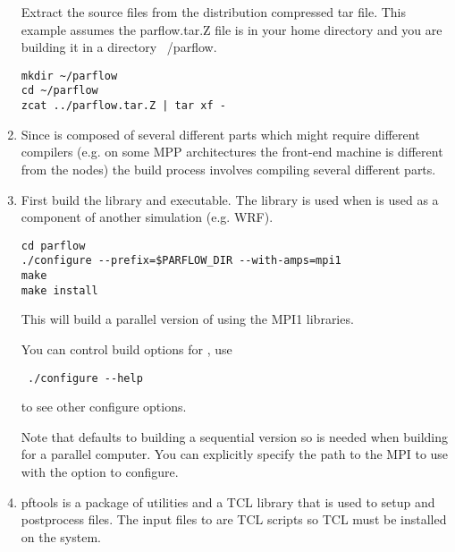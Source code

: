 \begin{enumerate}
Extract the source files from the distribution compressed tar file.
This example assumes the parflow.tar.Z file is in your home directory
and you are building it in a directory ~/parflow.

\begin{display}\begin{verbatim}
mkdir ~/parflow
cd ~/parflow
zcat ../parflow.tar.Z | tar xf -
\end{verbatim}\end{display}


\item

Since \parflow{} is composed of several different parts which might
require different compilers (e.g. on some MPP architectures the
front-end machine is different from the nodes) the build process
involves compiling several different parts.

\item

First build the \parflow{} library and executable.  The library is
used when \parflow{} is used as a component of another simulation
(e.g. WRF).  

\begin{display}\begin{verbatim}
cd parflow
./configure --prefix=$PARFLOW_DIR --with-amps=mpi1
make 
make install
\end{verbatim}\end{display}

This will build a parallel version of \parflow{} using the MPI1
libraries.

You can control build options for \parflow{}, use

\begin{display}\begin{verbatim}
 ./configure --help 
\end{verbatim}\end{display}

to see other configure options.   

Note that \parflow{} defaults to building a sequential version so
 is needed when building for a parallel computer.  You
can explicitly specify the path to the MPI to use with the
 option to configure.

\item

pftools is a package of utilities and a TCL library that is used to
setup and postprocess \parflow{} files.  The input files to \parflow{} are
TCL scripts so TCL must be installed on the system.


\end{enumerate}
